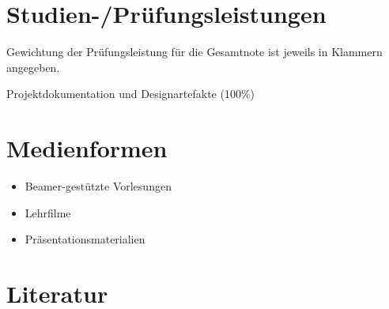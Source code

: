 \section*{Studien-/Prüfungsleistungen\label{/mi-2017/modulbeschreibungen-master/MA_HCI_InteractionDesign}}\label{studien-pruxfcfungsleistungenpathlabelmi-2017modulbeschreibungen-mastermaux5fhciux5finteractiondesign}

Gewichtung der Prüfungsleistung für die Gesamtnote ist jeweils in
Klammern angegeben.

Projektdokumentation und Designartefakte (100\%)

\section*{Medienformen\label{/mi-2017/modulbeschreibungen-master/MA_HCI_InteractionDesign}}\label{medienformenpathlabelmi-2017modulbeschreibungen-mastermaux5fhciux5finteractiondesign}

\begin{itemize}
\tightlist
\item
  Beamer-gestützte Vorlesungen
\item
  Lehrfilme
\item
  Präsentationsmaterialien
\end{itemize}

\section*{Literatur\label{/mi-2017/modulbeschreibungen-master/MA_HCI_InteractionDesign}}\label{literaturpathlabelmi-2017modulbeschreibungen-mastermaux5fhciux5finteractiondesign}

